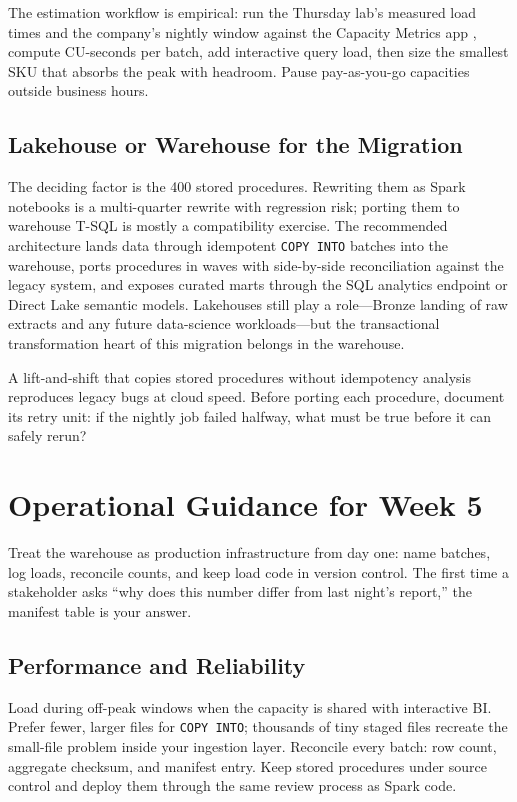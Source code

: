 The estimation workflow is empirical: run the Thursday lab's measured load times and the company's nightly window against the Capacity Metrics app \cite{microsoftFabricMetricsApp}, compute CU-seconds per batch, add interactive query load, then size the smallest SKU that absorbs the peak with headroom. Pause pay-as-you-go capacities outside business hours.

\subsection{Lakehouse or Warehouse for the Migration}
The deciding factor is the 400 stored procedures. Rewriting them as Spark notebooks is a multi-quarter rewrite with regression risk; porting them to warehouse T-SQL is mostly a compatibility exercise. The recommended architecture lands data through idempotent \texttt{COPY INTO} batches into the warehouse, ports procedures in waves with side-by-side reconciliation against the legacy system, and exposes curated marts through the SQL analytics endpoint or Direct Lake semantic models. Lakehouses still play a role---Bronze landing of raw extracts and any future data-science workloads---but the transactional transformation heart of this migration belongs in the warehouse.

\begin{pitfall}
A lift-and-shift that copies stored procedures without idempotency analysis reproduces legacy bugs at cloud speed. Before porting each procedure, document its retry unit: if the nightly job failed halfway, what must be true before it can safely rerun?
\end{pitfall}

\section{Operational Guidance for Week 5}
Treat the warehouse as production infrastructure from day one: name batches, log loads, reconcile counts, and keep load code in version control. The first time a stakeholder asks ``why does this number differ from last night's report,'' the manifest table is your answer.

\subsection{Performance and Reliability}
Load during off-peak windows when the capacity is shared with interactive BI. Prefer fewer, larger files for \texttt{COPY INTO}; thousands of tiny staged files recreate the small-file problem inside your ingestion layer. Reconcile every batch: row count, aggregate checksum, and manifest entry. Keep stored procedures under source control and deploy them through the same review process as Spark code.

